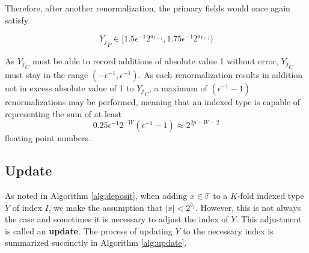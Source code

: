 \documentclass[12pt]{article}
\providecommand{\F}{\ensuremath{\mathbb{F}}}
\theoremstyle{definition}
\numberwithin{equation}{section}
\numberwithin{figure}{section}
\begin{document}
    Therefore, after another renormalization, the primary fields would once again satisfy

    \begin{equation*}
    {Y_j}_P \in [1.5  \epsilon^{-1} 2^{a_{I + j}}, 1.75  \epsilon^{-1} 2^{a_{I + j}})
    \end{equation*}

    As ${Y_j}_C$ must be able to record additions of absolute value 1 without error, ${Y_j}_C$ must stay in the range $(-\epsilon^{-1}, \epsilon^{-1})$. As each renormalization results in addition not in excess absolute value of 1 to ${Y_j}_C$, a maximum of $(\epsilon^{-1} - 1)$ renormalizations may be performed, meaning that an indexed type is capable of representing the sum of at least
    \begin{equation}
      0.25\epsilon^{-1}2^{-W}  (\epsilon^{-1} - 1) \approx 2^{2  p - W - 2}
      \label{eq:totalfreq}
    \end{equation}
    floating point numbers.

  \subsection{Update}
    \label{sec:primitiveops_update}
    As noted in Algorithm \ref{alg:deposit}, when adding $x \in \F$ to a $K$-fold indexed type $Y$ of index $I$, we make the assumption that $|x| < 2^{b_I}$. However, this is not always the case and sometimes it is necessary to adjust the index of $Y$. This adjustment is called an \textbf{update}. The process of updating $Y$ to the necessary index is summarized succinctly in Algorithm \ref{alg:update}.
\end{document}
